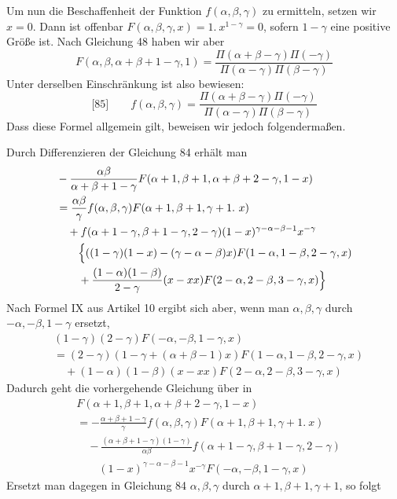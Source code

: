 Um nun die Beschaffenheit der Funktion \(f(\alpha,\beta,\gamma)\) zu ermitteln, setzen wir \(x=0\). Dann ist offenbar \(F(\alpha,\beta,\gamma,x)=1.\ x^{1-\gamma}=0\), sofern \(1-\gamma\) eine positive Größe ist. Nach Gleichung 48 haben wir aber
\[
F(\alpha,\beta,\alpha+\beta+1-\gamma,1)=\frac{\Pi(\alpha+\beta-\gamma)\Pi(-\gamma)}{\Pi(\alpha-\gamma)\Pi(\beta-\gamma)}
\]
Unter derselben Einschränkung ist also bewiesen:
\[
\text{[85]}\qquad f(\alpha,\beta,\gamma)=\frac{\Pi(\alpha+\beta-\gamma)\Pi(-\gamma)}{\Pi(\alpha-\gamma)\Pi(\beta-\gamma)}
\]
Dass diese Formel allgemein gilt, beweisen wir jedoch folgendermaßen.
\par{}
Durch Differenzieren der Gleichung 84 erhält man
\[
\begin{aligned}
&-\frac{\alpha\beta}{\alpha+\beta+1-\gamma}F(\alpha+1,\beta+1,\alpha+\beta+2-\gamma,1-x)\\
&=\frac{\alpha\beta}{\gamma}f(\alpha,\beta,\gamma)F(\alpha+1,\beta+1,\gamma+1.\ x)\\
&\quad+f(\alpha+1-\gamma,\beta+1-\gamma,2-\gamma)(1-x)^{\gamma-\alpha-\beta-1}x^{-\gamma}\\&\qquad\Bigl\{((1-\gamma)(1-x)-(\gamma-\alpha-\beta)x)F(1-\alpha,1-\beta,2-\gamma,x)\\
&\qquad+\frac{(1-\alpha)(1-\beta)}{2-\gamma}(x-xx)F(2-\alpha,2-\beta,3-\gamma,x)\Bigr\}
\end{aligned}
\]
Nach Formel IX aus Artikel 10 ergibt sich aber, wenn man \(\alpha,\beta,\gamma\) durch \(-\alpha,-\beta,1-\gamma\) ersetzt,
\[
\begin{aligned}
&(1-\gamma)(2-\gamma)F(-\alpha,-\beta,1-\gamma,x)\\&=(2-\gamma)(1-\gamma+(\alpha+\beta-1)x)F(1-\alpha,1-\beta,2-\gamma,x)\\
&\quad+(1-\alpha)(1-\beta)(x-xx)F(2-\alpha,2-\beta,3-\gamma,x)
\end{aligned}
\]
Dadurch geht die vorhergehende Gleichung über in
\[
\begin{aligned}
&F(\alpha+1,\beta+1,\alpha+\beta+2-\gamma,1-x)\\
&=-\frac{\alpha+\beta+1-\gamma}{\gamma}f(\alpha,\beta,\gamma)F(\alpha+1,\beta+1,\gamma+1.\ x)\\
&\quad-\frac{(\alpha+\beta+1-\gamma)(1-\gamma)}{\alpha\beta}f(\alpha+1-\gamma,\beta+1-\gamma,2-\gamma)\\&\qquad(1-x)^{\gamma-\alpha-\beta-1}x^{-\gamma}F(-\alpha,-\beta,1-\gamma,x)
\end{aligned}
\]
Ersetzt man dagegen in Gleichung 84 \(\alpha,\beta,\gamma\) durch \(\alpha+1,\beta+1,\gamma+1\), so folgt

